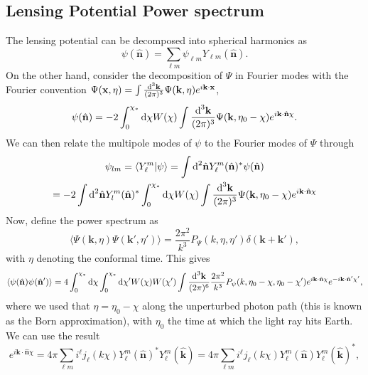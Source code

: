 \documentclass[11pt]{article} %
\DeclareRobustCommand{\d}{\ifmmode\text{d}\else d\fi}
\begin{document}
\subsection{Lensing Potential Power spectrum}
The lensing potential can be decomposed into spherical harmonics as
\begin{equation}
    \psi(\hat{\mathbf n}) = \sum_{\ell m} \psi_{\ell m}Y_{\ell m}(\hat{\mathbf n}).
\end{equation}
On the other hand, consider the decomposition of $\Psi$ in Fourier modes with the Fourier convention $\Psi(\mathbf x, \eta)=\int\frac{\d^3 \mathbf k}{(2\pi)^{3}}\Psi(\mathbf k, \eta)e^{i\mathbf k \cdot\mathbf x}$,
\begin{equation}
    \psi(\hat{\mathbf n}) = -2 \int_0^{\chi_*}\d \chi W(\chi) \int\frac{\d^3 \mathbf k}{(2\pi)^{3}}\Psi(\mathbf k, \eta_0 - \chi)e^{i\mathbf k \cdot\hat{\mathbf n}\chi}.
\end{equation}
We can then relate the multipole modes of $\psi$ to the Fourier modes of $\Psi$ through
\begin{gather}
    \psi_{lm} = \langle Y_\ell^m | \psi \rangle = \int\d^2\hat{\mathbf n} Y_\ell^m(\hat{\mathbf n})^* \psi(\hat{\mathbf n})\\ 
    = -2\int\d^2\hat{\mathbf n} Y_l^m(\hat{\mathbf n})^* \int_0^{\chi_*}\d \chi W(\chi) \int\frac{\d^3 \mathbf k}{(2\pi)^{3}}\Psi(\mathbf k, \eta_0 - \chi)e^{i\mathbf k \cdot\hat{\mathbf n}\chi}
\end{gather}
Now, define the power spectrum as
\begin{equation}
    \langle \Psi(\mathbf k, \eta)\Psi(\mathbf k',\eta')\rangle = \frac{2\pi^2}{k^3}P_\Psi(k, \eta, \eta')\delta(\mathbf k + \mathbf k'),
\end{equation}
with $\eta$ denoting the conformal time. This gives 
\begin{equation}
    \langle \psi(\hat{\mathbf n})\psi(\hat{\mathbf n}') \rangle = 4\int_0^{\chi_*}\d \chi\int_0^{\chi_*}\d \chi' W(\chi)W(\chi')\int \frac{\d^3\mathbf k}{(2\pi)^6}\frac{2\pi^2}{k^3}P_\psi(k,\eta_0 - \chi, \eta_0-\chi')e^{i\mathbf k\cdot\hat {\mathbf n}\chi}e^{-i\mathbf k\cdot\hat {\mathbf n}'\chi'},
\end{equation}
where we used that $\eta = \eta_0 - \chi$ along the unperturbed photon path (this is known as the Born approximation), with $\eta_0$ the time at which the light ray hits Earth. 
We can use the result
\begin{equation}
    e^{i\mathbf k \cdot \hat {\mathbf n}\chi}=4\pi\sum_{\ell m}i^\ell j_\ell(k\chi )Y_\ell^m(\hat{\mathbf n})^*Y_\ell^m(\hat{\mathbf k}) = 4\pi\sum_{\ell m}i^\ell j_\ell(k\chi )Y_\ell^m(\hat{\mathbf n})Y_\ell^m(\hat{\mathbf k})^*, \label{eq:complexexp}
\end{equation}
\end{document}
